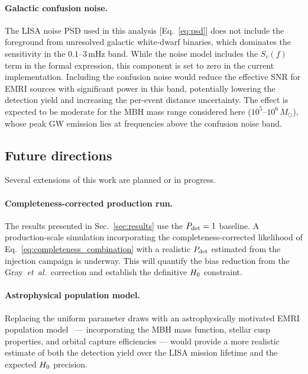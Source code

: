 \paragraph{Galactic confusion noise.}
The LISA noise PSD used in this analysis
[Eq.~\eqref{eq:psd}] does not include the foreground from unresolved
galactic white-dwarf binaries, which dominates the sensitivity in the
$0.1$--$3\,\mathrm{mHz}$ band.  While the noise model includes the
$S_c(f)$ term in the formal expression, this component is set to zero in
the current implementation.  Including the confusion noise would reduce
the effective SNR for EMRI sources with significant power in this band,
potentially lowering the detection yield and increasing the per-event
distance uncertainty.  The effect is expected to be moderate for the MBH
mass range considered here ($10^5$--$10^6\,M_\odot$), whose peak GW
emission lies at frequencies above the confusion noise band.

\subsection{Future directions}
\label{sec:future}

Several extensions of this work are planned or in progress.

\paragraph{Completeness-corrected production run.}
The results presented in Sec.~\ref{sec:results} use the $P_\mathrm{det} = 1$
baseline.  A production-scale simulation incorporating the
completeness-corrected likelihood of
Eq.~\eqref{eq:completeness_combination} with a realistic $P_\mathrm{det}$
estimated from the injection campaign is underway.  This will quantify
the bias reduction from the Gray~\emph{et~al.}\ correction and
establish the definitive $H_0$ constraint.

\paragraph{Astrophysical population model.}
Replacing the uniform parameter draws with an astrophysically motivated
EMRI population model~\cite{Babak:2017tow} --- incorporating the MBH
mass function, stellar cusp properties, and orbital capture
efficiencies --- would provide a more realistic estimate of both the
detection yield over the LISA mission lifetime and the expected $H_0$
precision.

